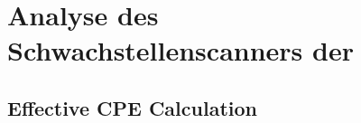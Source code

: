 \section{Analyse des Schwachstellenscanners der \metaeffektlg}


\subsection{Effective CPE Calculation}\label{subsec:effective-cpe-calculation}
